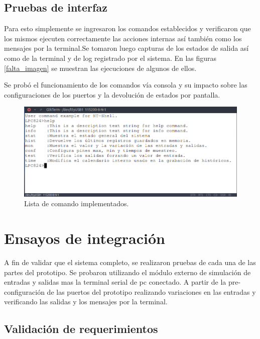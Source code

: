 \subsection{ Pruebas de interfaz }

Para esto simplemente se ingresaron los comandos establecidos y verificaron que los mismos ejecuten correctamente las acciones internas así también como los mensajes por la terminal.Se tomaron luego capturas de los estados de salida así como de la terminal y de log registrado por el sistema. En las figuras \ref{falta_imagen} se muestran las ejecuciones de algunos de ellos.

Se probó el funcionamiento de los comandos vía consola y su impacto sobre las configuraciones de los puertos y la devolución de estados por pantalla. 

\begin{figure}[h!]
	\centering
	\includegraphics[width=1.0\textwidth]{Figures/Cap_4/captura_consola}
	\caption{Lista de comando implementados.}
	\label{fig:term_Configuracion}
\end{figure}


\section{ Ensayos de integración }
\label{sec:pruebasINT}

A fin de validar que el sistema completo, se realizaron pruebas de cada una de las partes del prototipo. Se probaron utilizando el módulo externo de simulación de entradas y salidas mas la terminal serial de pc conectado. A partir de la pre-configuración de las puertos del prototipo realizando variaciones en las entradas y verificando las salidas y los mensajes por la terminal.


\subsection{ Validación de requerimientos }


